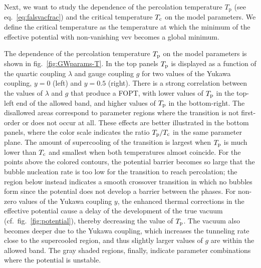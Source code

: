 Next, we want to study the dependence of the percolation temperature $T_\text{p}$ (see eq.~\eqref{eq:falsvacfrac}) and the critical temperature $T_{\text{c}}$ on the model parameters. We define the critical temperature as the temperature at which the minimum of the effective potential with non-vanishing \ac{vev} becomes a global minimum.

The dependence of the percolation temperature $T_{\text{p}}$ on the model parameters is shown in fig.~\ref{fig:GWparams-T}. In the top panels $T_{\text{p}}$ is displayed as a function of the quartic coupling $\lambda$ and gauge coupling $g$ for two values of the Yukawa coupling, $y = 0$ (left) and $y = 0.5$ (right). There is a strong correlation between the values of $\lambda$ and $g$ that produce a \ac{FOPT}, with lower values of $T_{\text{p}}$ in the top-left end of the allowed band, and higher values of $T_{\text{p}}$ in the bottom-right. The disallowed areas correspond to parameter regions where the transition is not first-order or does not occur at all. These effects are better illustrated in the bottom panels, where the color scale indicates the ratio $T_{\text{p}}/T_{\text{c}}$ in the same parameter plane. The amount of supercooling of the transition is largest when $T_{\text{p}}$ is much lower than $T_ {\text{c}}$ and smallest when both temperatures almost coincide. For the points above the colored contours,  the potential barrier becomes so large that the bubble nucleation rate is too low for the transition to reach percolation; the region below instead indicates a smooth crossover transition in which no bubbles form since the potential does not develop a barrier between the phases. For non-zero values of the Yukawa coupling $y$, the enhanced thermal corrections in the effective potential cause a delay of the development of the true vacuum (cf.~fig.~\ref{fig:potential}), thereby decreasing the value of $T_{\text{p}}$. The vacuum also becomes deeper due to the Yukawa coupling, which increases the tunneling rate close to the supercooled region, and thus slightly larger values of $g$ are within the allowed band. The gray shaded regions, finally, indicate parameter combinations where the potential is unstable.

